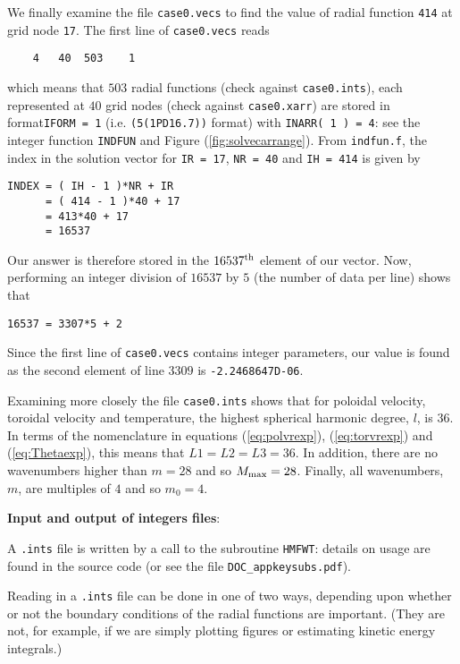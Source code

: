 We finally examine the file \verb+case0.vecs+ to find
the value of radial function \verb+414+ at grid node
\verb+17+. The first line of \verb+case0.vecs+ reads
\begin{verbatim}
    4   40  503    1
\end{verbatim}
which means that $503$ radial functions (check against
\verb+case0.ints+), each represented
at $40$ grid nodes (check against
\verb+case0.xarr+) are stored in format\verb+IFORM = 1+ (i.e.
\verb+(5(1PD16.7))+ format) with \verb+INARR( 1 ) = 4+:
see the integer function \verb+INDFUN+ and Figure 
(\ref{fig:solvecarrange}).
From \verb+indfun.f+, the index in the solution vector
for \verb+IR = 17+, \verb+NR = 40+ and \verb+IH = 414+ is
given by
\begin{verbatim}
INDEX = ( IH - 1 )*NR + IR
      = ( 414 - 1 )*40 + 17
      = 413*40 + 17
      = 16537
\end{verbatim}
Our answer is therefore stored in the $16537^{\rm th}$
element of our vector.
Now, performing an integer division of
$16537$ by $5$ (the number of data per line)
shows that
\begin{verbatim}
16537 = 3307*5 + 2
\end{verbatim}
Since the first line of \verb+case0.vecs+ contains
integer parameters, our value is found as the second
element of line $3309$ is 
\verb+-2.2468647D-06+. \newline

Examining more closely the file \verb+case0.ints+ shows that
for poloidal velocity, toroidal velocity and temperature,
the highest spherical harmonic degree, $l$, is $36$.
In terms of the nomenclature in equations
(\ref{eq:polvrexp}),
(\ref{eq:torvrexp}) and
(\ref{eq:Thetaexp}),
this means that $L1 = L2 = L3 = 36$.
In addition, there are no wavenumbers higher than $m = 28$ and so
$M_{\rm max} = 28$. Finally, all wavenumbers, $m$, are multiples
of $4$ and so $m_0 = 4$. \newline

{\bf Input and output of integers files}: \newline

A \verb+.ints+ file is written by a call to the
subroutine \verb+HMFWT+: details on usage are found
in the source code 
(or see the file \verb+DOC_appkeysubs.pdf+).

Reading in a \verb+.ints+ file can be done in one
of two ways, depending upon whether or not
the boundary conditions of the radial functions are
important. (They are not, for example, if we are simply
plotting figures or estimating kinetic energy integrals.)

